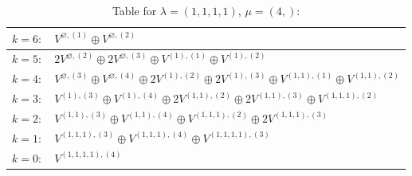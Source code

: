 \documentclass[a4paper,12pt]{article}
\begin{document}
\renewcommand{\arraystretch}{1.6} 
\begin{table}[H]
\centering
\caption{Table for $\lambda = (1, 1, 1, 1)$, $\mu = (4,)$:}
\begin{tabular}{|>{\centering\arraybackslash}p{15cm}|}
\hline
 $k = 6: \quad V^{\varnothing, (1)} \oplus V^{\varnothing, (2)} $ \\ \hline
 $k = 5: \quad 2 V^{\varnothing, (2)} \oplus 2 V^{\varnothing, (3)} \oplus V^{(1), (1)} \oplus V^{(1), (2)} $ \\ \hline
 $k = 4: \quad V^{\varnothing, (3)} \oplus V^{\varnothing, (4)} \oplus 2 V^{(1), (2)} \oplus 2 V^{(1), (3)} \oplus V^{(1, 1), (1)} \oplus V^{(1, 1), (2)} $ \\ \hline
 $k = 3: \quad V^{(1), (3)} \oplus V^{(1), (4)} \oplus 2 V^{(1, 1), (2)} \oplus 2 V^{(1, 1), (3)} \oplus V^{(1, 1, 1), (2)} $ \\ \hline
 $k = 2: \quad V^{(1, 1), (3)} \oplus V^{(1, 1), (4)} \oplus V^{(1, 1, 1), (2)} \oplus 2 V^{(1, 1, 1), (3)} $ \\ \hline
 $k = 1: \quad V^{(1, 1, 1), (3)} \oplus V^{(1, 1, 1), (4)} \oplus V^{(1, 1, 1, 1), (3)} $ \\ \hline
 $k = 0: \quad V^{(1, 1, 1, 1), (4)} $ \\ \hline
\end{tabular}
\end{table}
\end{document}
